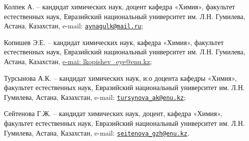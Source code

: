 \begin{authorinfo}
Колпек А. -- кандидат химических наук, доцент кафедра «Химия», факультет
естественных наук, Евразийский национальный университет им. Л.Н.
Гумилева, Астана, Казахстан, e-mail:
\href{mailto:aynagulk@mail.ru}{\nolinkurl{aynagulk@mail.ru}};

Копишев Э.Е. -- кандидат химических наук, кафедра «Химия», факультет
естественных наук, Евразийский национальный университет им. Л.Н.
Гумилева, Астана, Казахстан,
\href{mailto:e-mai:\%20lkopishev\_eye@enu.kz}{e-mai:
lkopishev\_eye@enu.kz};

Турсынова А.К. -- кандидат химических наук, и.о доцента кафедры «Химия»,
факультет естественных наук, Евразийский национальный университет им.
Л.Н. Гумилева, Астана, Казахстан, e-mail:
\href{mailto:tursynova\_ak@enu.kz}{\nolinkurl{tursynova\_ak@enu.kz}};

Сейтенова Г.Ж. -- кандидат химических наук, доцент, кафедра «Химия»,
факультет естественных наук, Евразийский национальный университет им.
Л.Н. Гумилева, Астана, Казахстан, e-mail:
\href{mailto:seitenova\_gzh@enu.kz}{\nolinkurl{seitenova\_gzh@enu.kz}}.
\end{authorinfo}
